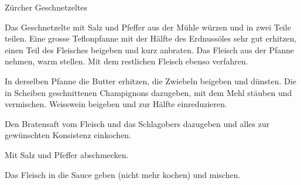 \begin{recipe}{Zürcher Geschnetzeltes}

    \begin{ingredients}
    \end{ingredients}

    \begin{instructions}
        Das Geschnetzelte mit Salz und Pfeffer aus der Mühle würzen und in zwei Teile teilen.
        Eine grosse Teflonpfanne mit der Hälfte des Erdnussöles sehr gut erhitzen, einen Teil des Fleisches beigeben und kurz anbraten.
        Das Fleisch aus der Pfanne nehmen, warm stellen.
        Mit dem restlichen Fleisch ebenso verfahren.

        In derselben Pfanne die Butter erhitzen, die Zwiebeln beigeben und dünsten.
        Die in Scheiben geschnittenen Champignons dazugeben, mit dem Mehl stäuben und vermischen.
        Weisswein beigeben und zur Hälfte einreduzieren.

        Den Bratensaft vom Fleisch und das Schlagobers dazugeben und alles zur gewünschten Konsistenz einkochen.

        Mit Salz und Pfeffer abschmecken.

        Das Fleisch in die Sauce geben (nicht mehr kochen) und mischen.
    \end{instructions}
\end{recipe}
